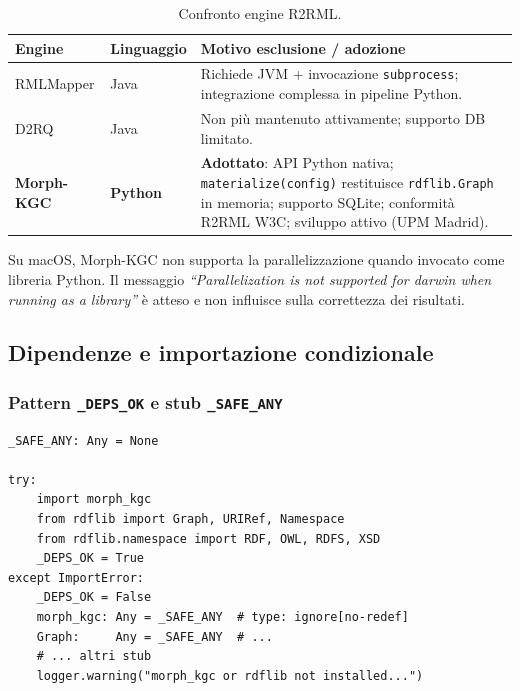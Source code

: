 \documentclass[a4paper,12pt]{article}
\begin{document}
\begin{table}[H]
\centering\small
\caption{Confronto engine R2RML.}
\begin{tabular}{L{3.5cm} L{3cm} L{6cm}}
\toprule
\textbf{Engine} & \textbf{Linguaggio} & \textbf{Motivo esclusione / adozione} \\
\midrule
RMLMapper & Java & Richiede JVM + invocazione \texttt{subprocess}; integrazione
             complessa in pipeline Python. \\
D2RQ & Java & Non pi\`{u} mantenuto attivamente; supporto DB limitato. \\
\textbf{Morph-KGC} & \textbf{Python} & \textbf{Adottato}: API Python nativa;
             \texttt{materialize(config)} restituisce \texttt{rdflib.Graph}
             in memoria; supporto SQLite; conformit\`{a} R2RML W3C; sviluppo
             attivo (UPM Madrid). \\
\bottomrule
\end{tabular}
\end{table}

\begin{warningbox}
Su macOS, Morph-KGC non supporta la parallelizzazione quando invocato
come libreria Python. Il messaggio \textit{``Parallelization is not
supported for darwin when running as a library''} \`{e} atteso e non
influisce sulla correttezza dei risultati.
\end{warningbox}

\subsection{Dipendenze e importazione condizionale}

\subsubsection{Pattern \texttt{\_DEPS\_OK} e stub \texttt{\_SAFE\_ANY}}

\begin{lstlisting}[caption={Importazione condizionale con fallback graceful.}]
_SAFE_ANY: Any = None

try:
    import morph_kgc
    from rdflib import Graph, URIRef, Namespace
    from rdflib.namespace import RDF, OWL, RDFS, XSD
    _DEPS_OK = True
except ImportError:
    _DEPS_OK = False
    morph_kgc: Any = _SAFE_ANY  # type: ignore[no-redef]
    Graph:     Any = _SAFE_ANY  # ...
    # ... altri stub
    logger.warning("morph_kgc or rdflib not installed...")
\end{lstlisting}
\end{document}
